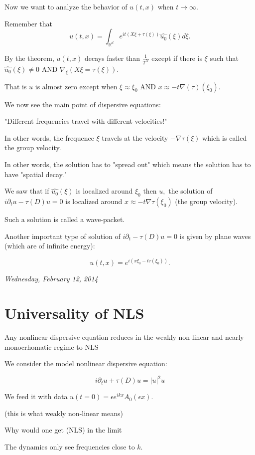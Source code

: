 \documentclass[11pt]{amsart}
\theoremstyle{plain}
\numberwithin{equation}{section}
\theoremstyle{remark}
\newcommand{\R}{\mathbb{R}}
\begin{document}
Now we want to analyze the behavior of $u(t,x)$ when $t\longrightarrow \infty.$

Remember that $$u(t,x)= \int_{\R^d} e^{it(X\xi+\tau(\xi))}\hat{u_{0}}(\xi)d\xi.$$

By the theorem, $u(t,x)$ decays faster than $\frac{1}{T^N}$ except if there is $\xi$ such that $\hat{u_{0}} (\xi) \not = 0$ AND $\nabla_{\xi} (X\xi =\tau(\xi)).$

That is $u$ is almost zero except when $\xi \approx \xi_0$ AND $x \approx -t \nabla (\tau) (\xi_0). $

We now see the main point of dispersive equations:

"Different frequencies travel with different velocities!" 

In other words, the frequence $\xi$ travels at the velocity $-\nabla \tau(\xi)$ which is called the group velocity.  

In other words, the solution has to "spread out" which means the solution has to have "spatial decay."

We saw that if $\hat{u_0} (\xi)$ is localized around $\xi_0$ then $u,$ the solution of $ i\partial_t u -\tau(D) u=0$ is localized around $x \approx -t \nabla \tau(\xi_0)$ (the group velocity). 

Such a solution is called a wave-packet. 

Another important type of solution of $i\partial_t -\tau (D) u=0$ is given by plane waves (which are of infinite energy):

$$u(t,x) = e^{i (x\xi_0 - t \tau(\xi_0))}.$$ 


\emph{Wednesday, February 12, 2014}

\section{Universality of NLS}

Any nonlinear dispersive equation reduces in the weakly non-linear and nearly monocrhomatic regime to NLS

We consider the model nonlinear dispersive equation:

$$i\partial_t u + \tau(D) u= |u|^2 u$$

We feed it with data $u(t=0)= \epsilon e^{ikx} A_{0}(\epsilon x).$

(this is what weakly non-linear means) 


Why would one get (NLS) in the limit

The dynamics only see frequencies close to $k.$
\end{document}
